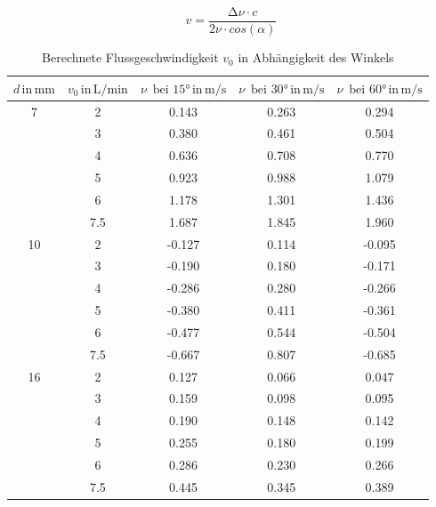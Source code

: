 \begin{equation}
    \label{equ:Geschw}
    v = \frac{\increment \nu \cdot c}{2\nu \cdot cos(\alpha)}
\end{equation}


\begin{table}
    \centering
    \caption{Berechnete Flussgeschwindigkeit $v_0$ in Abhängigkeit des Winkels}
    \begin{tabular}{c | c c c c}
        \toprule
        {$d \, \text{in} \, \si{\milli\meter} $} & {$v_0 \, \text{in} \, \si{\liter\per\minute}$} & {$\nu \,\text{ bei } 15° \, \text{in} \, \si{\meter\per\second}$} & {$\nu \, \text{ bei } 30° \, \text{in} \, \si{\meter\per\second}$} & {$\nu \, \text{ bei } 60° \, \text{in} \, \si{\meter\per\second}$} \\
        \midrule
    7 &    2     &     0.143    &     0.263   &     0.294 \\
     &    3      &     0.380    &     0.461   &     0.504 \\
     &    4      &     0.636    &     0.708    &    0.770 \\
     &    5      &     0.923   &      0.988   &     1.079 \\
     &    6      &     1.178    &     1.301   &     1.436 \\
     &    7.5    &     1.687    &     1.845   &     1.960\\
    \midrule
    10 &    2     &    -0.127  &      0.114     &   -0.095  \\
     &    3       &    -0.190    &    0.180     &   -0.171  \\
     &    4       &    -0.286   &     0.280     &   -0.266  \\
     &    5       &    -0.380   &     0.411      &  -0.361  \\
     &    6       &    -0.477   &     0.544      &  -0.504  \\
     &    7.5     &    -0.667   &     0.807     &   -0.685 \\
    \midrule
    16 &    2      &   0.127  &       0.066   &     0.047  \\
     &    3        &   0.159    &     0.098    &    0.095 \\
     &    4        &   0.190    &     0.148   &     0.142 \\
     &    5        &   0.255    &     0.180   &     0.199 \\
     &    6        &   0.286   &      0.230    &    0.266 \\
     &    7.5      &   0.445   &      0.345   &     0.389 \\

        \bottomrule
    \end{tabular}
    \label{tab:b}
\end{table}

